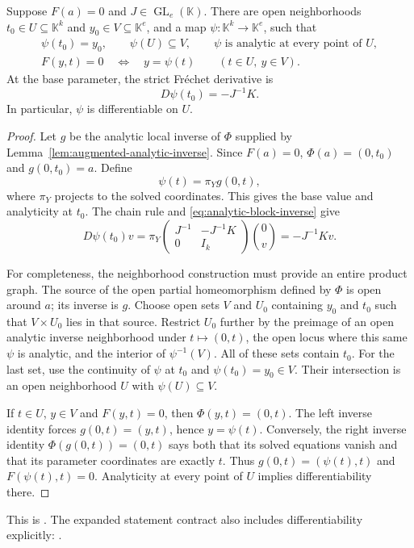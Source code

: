 \begin{theorem}
\label{thm:analytic-local-graph}
Suppose $F(a)=0$ and $J\in\operatorname{GL}_e(\mathbb K)$. There are open
neighborhoods $t_0\in U\subseteq\mathbb K^k$ and
$y_0\in V\subseteq\mathbb K^e$, and a map
$\psi:\mathbb K^k\to\mathbb K^e$, such that
\begin{gather}
 \psi(t_0)=y_0,\qquad \psi(U)\subseteq V,\qquad
 \psi\text{ is analytic at every point of }U,\label{eq:analytic-psi}\\
 F(y,t)=0\quad\Longleftrightarrow\quad y=\psi(t)
 \qquad(t\in U,\ y\in V).\label{eq:analytic-root-graph}
\end{gather}
At the base parameter, the strict Fr\'echet derivative is
\begin{equation}
 \boxed{D\psi(t_0)=-J^{-1}K.}
 \label{eq:implicit-derivative}
\end{equation}
In particular, $\psi$ is differentiable on $U$.
\end{theorem}
\begin{proof}
Let $g$ be the analytic local inverse of $\Phi$ supplied by
Lemma~\ref{lem:augmented-analytic-inverse}. Since $F(a)=0$,
$\Phi(a)=(0,t_0)$ and $g(0,t_0)=a$. Define
\[
 \psi(t)=\pi_Yg(0,t),
\]
where $\pi_Y$ projects to the solved coordinates. This gives the base value
and analyticity at $t_0$. The chain rule and
\eqref{eq:analytic-block-inverse} give
\[
 D\psi(t_0)v
 =\pi_Y\begin{pmatrix}J^{-1}&-J^{-1}K\\0&I_k\end{pmatrix}
       \binom{0}{v}
 =-J^{-1}Kv.
\]

For completeness, the neighborhood construction must provide an entire
product graph. The source of the open partial homeomorphism defined by
$\Phi$ is open around $a$; its inverse is $g$. Choose open sets $V$ and $U_0$
containing $y_0$ and $t_0$ such that
$V\times U_0$ lies in that source. Restrict $U_0$ further by the preimage of
an open analytic inverse neighborhood under $t\mapsto(0,t)$, the open locus
where this same $\psi$ is analytic, and the interior of $\psi^{-1}(V)$.
All of these sets contain $t_0$. For the last set, use the continuity of
$\psi$ at $t_0$ and $\psi(t_0)=y_0\in V$. Their intersection is an open
neighborhood $U$ with $\psi(U)\subseteq V$.

If $t\in U$, $y\in V$ and $F(y,t)=0$, then
$\Phi(y,t)=(0,t)$. The left inverse identity forces
$g(0,t)=(y,t)$, hence $y=\psi(t)$. Conversely, the right inverse identity
$\Phi(g(0,t))=(0,t)$ says both that its solved equations vanish and that its
parameter coordinates are exactly $t$. Thus
$g(0,t)=(\psi(t),t)$ and $F(\psi(t),t)=0$.
Analyticity at every point of $U$ implies differentiability there.
\end{proof}
This is
.
The expanded statement contract also includes differentiability explicitly:
.

